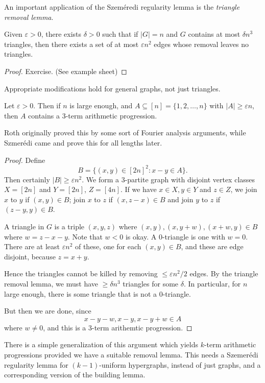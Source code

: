 \documentclass[a4paper]{article}
\begin{document}
An important application of the Szem\'eredi regularity lemma is the \emph{triangle removal lemma}.
\begin{thm}
  Given $\varepsilon > 0$, there exists $\delta > 0$ such that if $|G| = n$ and $G$ contains at most $\delta n^3$ triangles, then there exists a set of at most $\varepsilon n^2$ edges whose removal leaves no triangles.
\end{thm}

\begin{proof}
  Exercise. (See example sheet)
\end{proof}
Appropriate modifications hold for general graphs, not just triangles.

\begin{cor}[Roth, 1950's]
  Let $\varepsilon > 0$. Then if $n$ is large enough, and $A \subseteq [n] = \{1, 2, \ldots, n\}$ with $|A| \geq \varepsilon n$, then $A$ contains a $3$-term arithmetic progression.
\end{cor}
Roth originally proved this by some sort of Fourier analysis arguments, while Szmer\'edi came and prove this for all lengths later.

\begin{proof}
  Define
  \[
    B = \{(x, y) \in [2n]^2 : x - y \in A\}.
  \]
  Then certainly $|B| \geq \varepsilon n^2$. We form a $3$-partite graph with disjoint vertex classes $X = [2n]$ and $Y = [2n]$, $Z = [4n]$. If we have $x \in X, y \in Y$ and $z \in Z$, we join $x$ to $y$ if $(x, y) \in B$; join $x$ to $z$ if $(x, z - x) \in B$ and join $y$ to $z$ if $(z - y, y) \in B$.

  A triangle in $G$ is a triple $(x, y, z)$ where $(x, y), (x, y + w), (x + w, y) \in B$ where $w = z - x - y$. Note that $w < 0$ is okay. A $0$-triangle is one with $w = 0$. There are at least $\varepsilon n^2 $ of these, one for each $(x, y) \in B$, and these are edge disjoint, because $z = x + y$.

  Hence the triangles cannot be killed by removing $\leq \varepsilon n^2/2$ edges. By the triangle removal lemma, we must have $\geq \delta n^3$ triangles for some $\delta$. In particular, for $n$ large enough, there is some triangle that is not a $0$-triangle.

  But then we are done, since
  \[
    x - y - w, x - y, x - y + w \in A
  \]
  where $w \not= 0$, and this is a $3$-term arithemtic progression.
\end{proof}
There is a simple generalization of this argument which yields $k$-term arithmetic progressions provided we have a suitable removal lemma. This needs a Szemer\'edi regularity lemma for $(k - 1)$-uniform hypergraphs, instead of just graphs, and a corresponding version of the building lemma.
\end{document}
